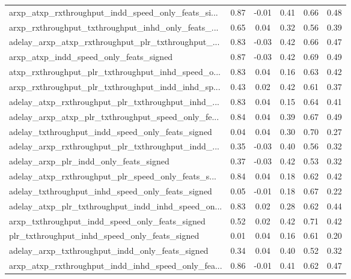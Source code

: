 \begin{tabular}{|l|*{4}{c}|r|}
arxp\_atxp\_rxthroughput\_indd\_speed\_only\_feats\_si... & 0.87 & -0.01 &    0.41 &       0.66 &  0.48 \\
arxp\_rxthroughput\_txthroughput\_inhd\_only\_feats\_... & 0.65 &  0.04 &    0.32 &       0.56 &  0.39 \\
adelay\_arxp\_atxp\_rxthroughput\_plr\_txthroughput\_... & 0.83 & -0.03 &    0.42 &       0.66 &  0.47 \\
arxp\_atxp\_indd\_speed\_only\_feats\_signed             & 0.87 & -0.03 &    0.42 &       0.69 &  0.49 \\
atxp\_rxthroughput\_plr\_txthroughput\_inhd\_speed\_o... & 0.83 &  0.04 &    0.16 &       0.63 &  0.42 \\
arxp\_rxthroughput\_plr\_txthroughput\_indd\_inhd\_sp... & 0.43 &  0.02 &    0.42 &       0.61 &  0.37 \\
adelay\_atxp\_rxthroughput\_plr\_txthroughput\_inhd\_... & 0.83 &  0.04 &    0.15 &       0.64 &  0.41 \\
adelay\_arxp\_atxp\_plr\_txthroughput\_speed\_only\_fe... & 0.84 &  0.04 &    0.39 &       0.67 &  0.49 \\
adelay\_txthroughput\_indd\_speed\_only\_feats\_signed   & 0.04 &  0.04 &    0.30 &       0.70 &  0.27 \\
adelay\_arxp\_rxthroughput\_plr\_txthroughput\_indd\_... & 0.35 & -0.03 &    0.40 &       0.56 &  0.32 \\
adelay\_arxp\_plr\_indd\_only\_feats\_signed             & 0.37 & -0.03 &    0.42 &       0.53 &  0.32 \\
adelay\_atxp\_rxthroughput\_plr\_speed\_only\_feats\_s... & 0.84 &  0.04 &    0.18 &       0.62 &  0.42 \\
adelay\_txthroughput\_inhd\_speed\_only\_feats\_signed   & 0.05 & -0.01 &    0.18 &       0.67 &  0.22 \\
adelay\_atxp\_plr\_txthroughput\_indd\_inhd\_speed\_on... & 0.83 &  0.02 &    0.28 &       0.62 &  0.44 \\
arxp\_txthroughput\_indd\_speed\_only\_feats\_signed     & 0.52 &  0.02 &    0.42 &       0.71 &  0.42 \\
plr\_txthroughput\_inhd\_speed\_only\_feats\_signed      & 0.01 &  0.04 &    0.16 &       0.61 &  0.20 \\
adelay\_arxp\_txthroughput\_indd\_only\_feats\_signed    & 0.34 &  0.04 &    0.40 &       0.52 &  0.32 \\
arxp\_atxp\_rxthroughput\_indd\_inhd\_speed\_only\_fea... & 0.86 & -0.01 &    0.41 &       0.62 &  0.47 \\

\end{tabular}
